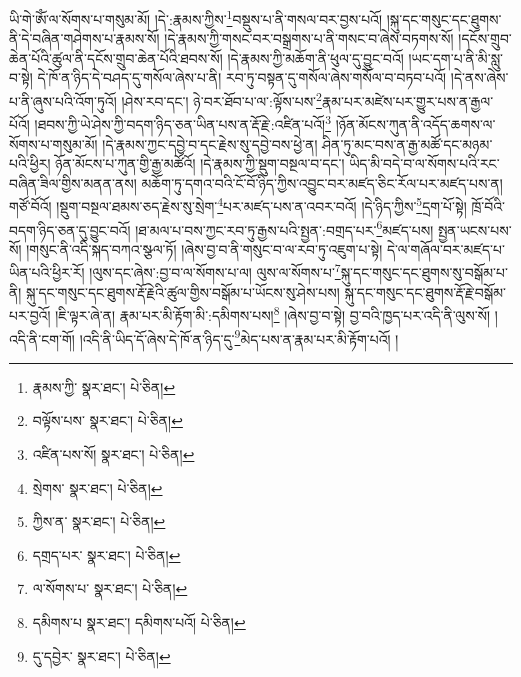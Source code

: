 ཡི་གེ་ཨོཾ་ལ་སོགས་པ་གསུམ་མོ། །དེ་:རྣམས་ཀྱིས་\footnote{རྣམས་ཀྱི་  སྣར་ཐང་།  པེ་ཅིན། }བསྡུས་པ་ནི་གསལ་བར་བྱས་པའོ། །སྐུ་དང་གསུང་དང་ཐུགས་ནི་དེ་བཞིན་གཤེགས་པ་རྣམས་སོ། །དེ་རྣམས་ཀྱི་གསང་བར་བསྒྲགས་པ་ནི་གསང་བ་ཞེས་བཏགས་སོ། །དངོས་གྲུབ་ཆེན་པོའི་ཚུལ་ནི་དངོས་གྲུབ་ཆེན་པོའི་ཐབས་སོ། །དེ་རྣམས་ཀྱི་མཆོག་ནི་ཕུལ་དུ་བྱུང་བའོ། །ཡང་དག་པ་ནི་མི་སླུ་བ་སྟེ། དེ་ཁོ་ན་ཉིད་དེ་བཤད་དུ་གསོལ་ཞེས་པ་ནི། རབ་ཏུ་བསྟན་དུ་གསོལ་ཞེས་གསོལ་བ་བཏབ་པའོ། །དེ་ནས་ཞེས་པ་ནི་ཞུས་པའི་འོག་ཏུའོ། །ཤེས་རབ་དང་། ཉེ་བར་ཐོབ་པ་ལ་:ལྟོས་པས་\footnote{བལྟོས་པས་  སྣར་ཐང་།  པེ་ཅིན། }རྣམ་པར་མཛེས་པར་གྱུར་པས་ན་རྒྱལ་པོའོ། །ཐབས་ཀྱི་ཡེ་ཤེས་ཀྱི་བདག་ཉིད་ཅན་ཡིན་པས་ན་རྡོ་རྗེ་:འཛིན་པའོ།\footnote{འཛིན་པས་སོ།  སྣར་ཐང་།  པེ་ཅིན། } །ཉོན་མོངས་ཀུན་ནི་འདོད་ཆགས་ལ་སོགས་པ་གསུམ་མོ། །དེ་རྣམས་ཀྱང་དབྱེ་བ་དང་རྗེས་སུ་དབྱེ་བས་ཕྱེ་ན། ཤིན་ཏུ་མང་བས་ན་རྒྱ་མཚོ་དང་མཉམ་པའི་ཕྱིར། ཉོན་མོངས་པ་ཀུན་གྱི་རྒྱ་མཚོའོ། །དེ་རྣམས་ཀྱི་སྡུག་བསྔལ་བ་དང་། ཡིད་མི་བདེ་བ་ལ་སོགས་པའི་རང་བཞིན་ཟིལ་གྱིས་མནན་ནས། མཆོག་ཏུ་དགའ་བའི་ངོ་བོ་ཉིད་ཀྱིས་འབྱུང་བར་མཛད་ཅིང་རོལ་པར་མཛད་པས་ན། གཙོ་བོའོ། །སྡུག་བསྔལ་ཐམས་ཅད་རྗེས་སུ་སྲེག་\footnote{སྲེགས་  སྣར་ཐང་།  པེ་ཅིན། }པར་མཛད་པས་ན་འབར་བའོ། །དེ་ཉིད་ཀྱིས་\footnote{ཀྱིས་ན་  སྣར་ཐང་།  པེ་ཅིན། }དྲག་པོ་སྟེ། ཁྲོ་བོའི་བདག་ཉིད་ཅན་དུ་བྱུང་བའོ། །ཐ་མལ་པ་བས་ཀྱང་རབ་ཏུ་རྒྱས་པའི་སྤྱན་:བགྲད་པར་\footnote{དགྲད་པར་  སྣར་ཐང་།  པེ་ཅིན། }མཛད་པས། སྤྱན་ཡངས་པས་སོ། །གསུང་ནི་འདི་སྐད་བཀའ་སྩལ་ཏོ། །ཞེས་བྱ་བ་ནི་གསུང་བ་ལ་རབ་ཏུ་འཇུག་པ་སྟེ། དེ་ལ་གཞོལ་བར་མཛད་པ་ཡིན་པའི་ཕྱིར་རོ། །ལུས་དང་ཞེས་:བྱ་བ་ལ་སོགས་པ་ལ། ལུས་ལ་སོགས་པ་\footnote{ལ་སོགས་པ་  སྣར་ཐང་།  པེ་ཅིན། }སྐུ་དང་གསུང་དང་ཐུགས་སུ་བསྒོམ་པ་ནི། སྐུ་དང་གསུང་དང་ཐུགས་རྡོ་རྗེའི་ཚུལ་གྱིས་བསྒོམ་པ་ཡོངས་སུ་ཤེས་པས། སྐུ་དང་གསུང་དང་ཐུགས་རྡོ་རྗེ་བསྒོམ་པར་བྱའོ། །ཇི་ལྟར་ཞེ་ན། རྣམ་པར་མི་རྟོག་མི་:དམིགས་པས།\footnote{དམིགས་པ  སྣར་ཐང་། དམིགས་པའོ།  པེ་ཅིན། } །ཞེས་བྱ་བ་སྟེ། བྱ་བའི་ཁྱད་པར་འདི་ནི་ལུས་སོ། །འདི་ནི་ངག་གོ། །འདི་ནི་ཡིད་དོ་ཞེས་དེ་ཁོ་ན་ཉིད་དུ་\footnote{དུ་དབྱེར་  སྣར་ཐང་།  པེ་ཅིན། }མེད་པས་ན་རྣམ་པར་མི་རྟོག་པའོ། །
